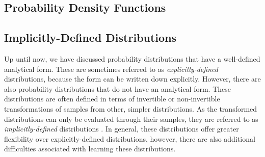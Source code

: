 \subsection{Probability Density Functions}


\subsection{Implicitly-Defined Distributions}

Up until now, we have discussed probability distributions that have a well-defined analytical form. These are sometimes referred to as \textit{explicitly-defined} distributions, because the form can be written down explicitly. However, there are also probability distributions that do not have an analytical form. These distributions are often defined in terms of invertible \cite{dinh2014nice} or non-invertible \cite{goodfellow2014generative} transformations of samples from other, simpler distributions. As the transformed distributions can only be evaluated through their samples, they are referred to as \textit{implicitly-defined} distributions \cite{mohamed2016learning}. In general, these distributions offer greater flexibility over explicitly-defined distributions, however, there are also additional difficulties associated with learning these distributions.